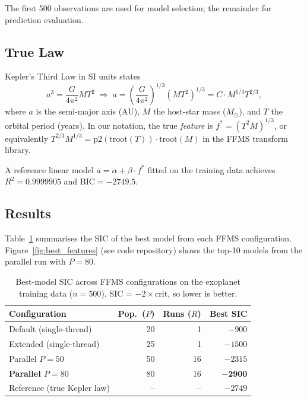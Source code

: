 \documentclass[12pt,a4paper]{article}
\newcommand{\BIC}{\mathrm{BIC}}
\begin{document}
The first 500 observations are used for model selection; the remainder for
prediction evaluation.

\subsection{True Law}

Kepler's Third Law in SI units states
\begin{equation}
  a^3 = \frac{G}{4\pi^2} M T^2
  \;\Longrightarrow\;
  a = \left(\frac{G}{4\pi^2}\right)^{1/3} (M T^2)^{1/3}
  = C \cdot M^{1/3} T^{2/3},
  \label{eq:kepler}
\end{equation}
where $a$ is the semi-major axis (AU), $M$ the host-star mass ($M_\odot$),
and $T$ the orbital period (years).
In our notation, the true \emph{feature} is
$f^* = (T^2 M)^{1/3}$, or equivalently
$T^{2/3} M^{1/3} = \mathrm{p2}(\mathrm{troot}(T)) \cdot \mathrm{troot}(M)$
in the FFMS transform library.

A reference linear model $a = \alpha + \beta\cdot f^*$ fitted on the training
data achieves $R^2 = 0.9999905$ and $\BIC = -2749.5$.

\subsection{Results}

Table~\ref{tab:results} summarises the SIC of the best model from each FFMS
configuration. Figure~\ref{fig:best_features} (see code repository) shows the
top-10 models from the parallel run with $P=80$.

\begin{table}[H]
  \centering
  \caption{Best-model SIC across FFMS configurations on the exoplanet training
           data ($n=500$). SIC = $-2\times\mathrm{crit}$, so lower is better.}
  \label{tab:results}
  \begin{tabular}{lrrr}
    \toprule
    Configuration & Pop.\ ($P$) & Runs ($R$) & Best SIC \\
    \midrule
    Default (single-thread)      & 20  & 1  & $-900$ \\
    Extended (single-thread)     & 25  & 1  & $-1500$ \\
    Parallel $P=50$              & 50  & 16 & $-2315$ \\
    \textbf{Parallel $P=80$}     & 80  & 16 & $\bm{-2900}$ \\
    \midrule
    Reference (true Kepler law)  & --  & -- & $-2749$ \\
    \bottomrule
  \end{tabular}
\end{table}
\end{document}
